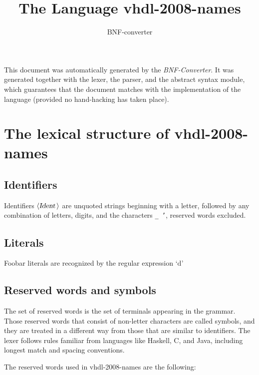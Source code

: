 \documentclass[a4paper,11pt]{article}
\author{BNF-converter}
\title{The Language vhdl-2008-names}
\begin{document}
\maketitle

\newcommand{\emptyP}{\mbox{$\epsilon$}}
\newcommand{\terminal}[1]{\mbox{{\texttt {#1}}}}
\newcommand{\nonterminal}[1]{\mbox{$\langle \mbox{{\sl #1 }} \! \rangle$}}
\newcommand{\arrow}{\mbox{::=}}
\newcommand{\delimit}{\mbox{$|$}}
\newcommand{\reserved}[1]{\mbox{{\texttt {#1}}}}
\newcommand{\literal}[1]{\mbox{{\texttt {#1}}}}
\newcommand{\symb}[1]{\mbox{{\texttt {#1}}}}

This document was automatically generated by the {\em BNF-Converter}. It was generated together with the lexer, the parser, and the abstract syntax module, which guarantees that the document matches with the implementation of the language (provided no hand-hacking has taken place).

\section*{The lexical structure of vhdl-2008-names}
\subsection*{Identifiers}
Identifiers \nonterminal{Ident} are unquoted strings beginning with a letter,
followed by any combination of letters, digits, and the characters {\tt \_ '},
reserved words excluded.


\subsection*{Literals}






Foobar literals are recognized by the regular expression
\(\mbox{`d'}\)


\subsection*{Reserved words and symbols}
The set of reserved words is the set of terminals appearing in the grammar. Those reserved words that consist of non-letter characters are called symbols, and they are treated in a different way from those that are similar to identifiers. The lexer follows rules familiar from languages like Haskell, C, and Java, including longest match and spacing conventions.

The reserved words used in vhdl-2008-names are the following: \\
\end{document}
